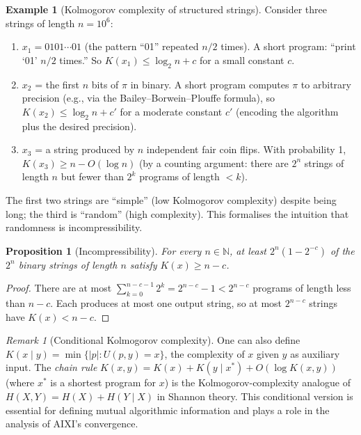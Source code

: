 \documentclass[11pt,a4paper]{article}
\newtheorem{proposition}[theorem]{Proposition}
\theoremstyle{definition}
\newtheorem{example}[theorem]{Example}
\theoremstyle{remark}
\newtheorem{remark}[theorem]{Remark}
\newcommand{\Nat}{\mathbb{N}}
\begin{document}
\begin{example}[Kolmogorov complexity of structured strings]\label{ex:structured}
Consider three strings of length $n=10^6$:
\begin{enumerate}[nosep]
\item $x_1 = 0101\cdots01$ (the pattern ``01'' repeated $n/2$ times).
      A short program: ``print `01' $n/2$ times.''  So $K(x_1)\le \log_2 n + c$
      for a small constant $c$.
\item $x_2$ = the first $n$ bits of $\pi$ in binary.  A short program computes
      $\pi$ to arbitrary precision (e.g., via the Bailey--Borwein--Plouffe formula),
      so $K(x_2)\le \log_2 n + c'$ for a moderate constant $c'$ (encoding the
      algorithm plus the desired precision).
\item $x_3$ = a string produced by $n$ independent fair coin flips.  With
      probability 1, $K(x_3)\ge n - O(\log n)$ (by a counting argument: there
      are $2^n$ strings of length $n$ but fewer than $2^k$ programs of length $<k$).
\end{enumerate}
The first two strings are ``simple'' (low Kolmogorov complexity) despite
being long; the third is ``random'' (high complexity).  This formalises
the intuition that randomness is incompressibility.
\end{example}

\begin{proposition}[Incompressibility]\label{prop:incompress}
For every $n\in\Nat$, at least $2^n(1-2^{-c})$ of the $2^n$ binary strings
of length $n$ satisfy $K(x)\ge n-c$.
\end{proposition}

\begin{proof}
There are at most $\sum_{k=0}^{n-c-1}2^k = 2^{n-c}-1 < 2^{n-c}$ programs
of length less than $n-c$.  Each produces at most one output string, so
at most $2^{n-c}$ strings have $K(x)<n-c$.
\end{proof}

\begin{remark}[Conditional Kolmogorov complexity]
One can also define $K(x\mid y)=\min\{|p|:U(p,y)=x\}$, the complexity of
$x$ given $y$ as auxiliary input.  The \emph{chain rule}
$K(x,y)=K(x)+K(y\mid x^*)+O(\log K(x,y))$ (where $x^*$ is a shortest
program for $x$) is the Kolmogorov-complexity analogue of
$H(X,Y)=H(X)+H(Y\mid X)$ in Shannon theory.
This conditional version is essential for defining mutual algorithmic
information and plays a role in the analysis of AIXI's convergence.
\end{remark}
\end{document}
